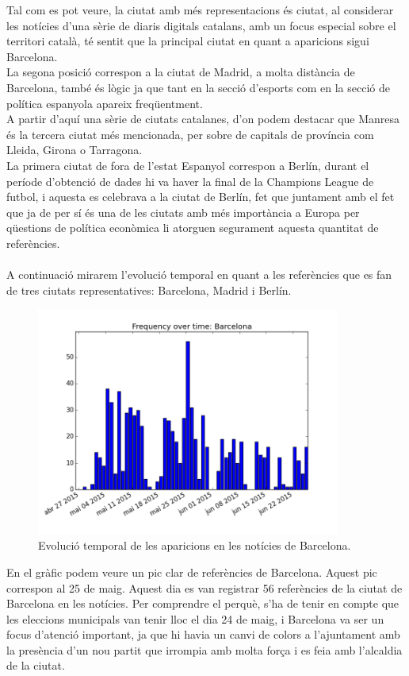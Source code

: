 \documentclass[12pt,a4paper,openright,oneside]{article}
\numberwithin{equation}{section}
\theoremstyle{definition}
\begin{document}
Tal com es pot veure, la ciutat amb més representacions és ciutat, al considerar les notícies d'una sèrie de diaris digitals catalans, amb un focus especial sobre el territori català, té sentit que la principal ciutat en quant a aparicions sigui Barcelona.\\
La segona posició correspon a la ciutat de Madrid, a molta distància de Barcelona, també és lògic ja que tant en la secció d'esports com en la secció de política espanyola apareix freqüentment.\\ A partir d'aquí una sèrie de ciutats catalanes, d'on podem destacar que Manresa és la tercera ciutat més mencionada, per sobre de capitals de província com Lleida, Girona o Tarragona.\\
La primera ciutat de fora de l'estat Espanyol correspon a Berlín, durant el període d'obtenció de dades hi va haver la final de la Champions League de futbol, i aquesta es celebrava a la ciutat de Berlín, fet que juntament amb el fet que ja de per sí és una de les ciutats amb més importància a Europa per qüestions de política econòmica li atorguen segurament aquesta quantitat de referències.\\\\
A continuació mirarem l'evolució temporal en quant a les referències que es fan de tres ciutats representatives: Barcelona, Madrid i Berlín.

\begin{figure}[!htbp]
\centering
\includegraphics[width=10cm]{bcn-1.png}
\caption{Evolució temporal de les aparicions en les notícies de Barcelona.}
\end{figure}
En el gràfic podem veure un pic clar de referències de Barcelona. Aquest pic correspon al 25 de maig. Aquest dia es van registrar 56 referències de la ciutat de Barcelona en les notícies. Per comprendre el perquè, s'ha de tenir en compte que les eleccions municipals van tenir lloc el dia 24 de maig, i Barcelona va ser un focus d'atenció important, ja que hi havia un canvi de colors a l'ajuntament amb la presència d'un nou partit que irrompia amb molta força i es feia amb l'alcaldia de la ciutat.
\end{document}
